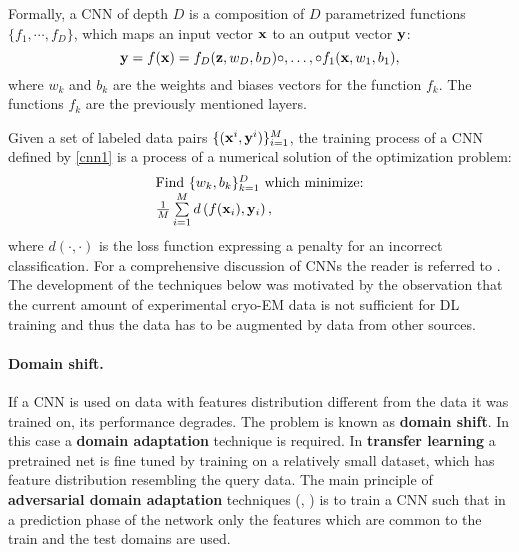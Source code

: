 Formally, a CNN of depth $D$  is a composition of $D$  parametrized functions $\{f_1,\cdots,f_D\}$, which maps an input vector $\mathbf{x}$ to an output vector $\mathbf{y}$:
\begin{equation}\label{cnn1}
	\mathbf{y} = f(\mathbf{x}) = f_D(\mathbf{z},w_D,b_D) \circ, \ldots, \circ f_1(\mathbf{x},w_1,b_1),
\end{equation}
where $w_k$ and $b_k$ are the weights and biases vectors for the function $f_k$.  The functions $f_k$ are the previously mentioned layers.

Given a set of labeled data pairs $\{(\mathbf{x}^i,\mathbf{y}^i)\}_{i=1}^M$, the training process of a CNN defined by \eqref{cnn1} is a process of a numerical solution of the optimization problem:
\begin{equation}
\begin{array}{l}
\mbox{Find } \{w_k, b_k\}_{k=1}^D \mbox{ which minimize:} \\
\frac{1}{M} \sum\limits_{i=1}^{M}d\left(f(\mathbf{x}_i),\mathbf{y}_i\right),
\end{array}
\end{equation}
where $d(\cdot,\cdot)$ is the loss function expressing a penalty for an incorrect classification.
For a comprehensive discussion of CNNs the reader is referred to  \cite{Goodfellow2016}.
\newline
\newline
The development of the techniques below was motivated by the observation that the current amount of experimental cryo-EM data is not sufficient for DL training and thus the data has to be augmented by data from other sources.
\paragraph{Domain shift.}
If a CNN is used on data with  features distribution different from the data it was trained on, its performance degrades.
The problem is known as \textbf{domain shift}. 
In this case a \textbf{domain adaptation} technique is required.
In \textbf{transfer learning }  \cite{Oquab } a pretrained net is fine tuned by training on a relatively small dataset, which has feature distribution resembling the query data.
The main principle of \textbf{adversarial domain adaptation} techniques (\cite{Tzeng2017}, \cite{Ganin2017}) is to train a CNN such that in a prediction phase of the network only the features  which are common to the train and the test domains are used.

